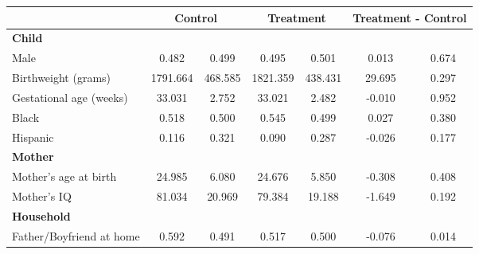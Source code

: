 \begin{tabular}{lcccccc}
\toprule
& \multicolumn{2}{c}{Control} & \multicolumn{2}{c}{Treatment} & \multicolumn{2}{c}{Treatment - Control} \\
\midrule
\textbf{Child} & & & & & & \\
\quad\quad Male & 0.482 & 0.499 & 0.495 & 0.501 & 0.013 & 0.674 \\
\quad\quad Birthweight (grams) & 1791.664 & 468.585 & 1821.359 & 438.431 & 29.695 & 0.297 \\
\quad\quad Gestational age (weeks) & 33.031 & 2.752 & 33.021 & 2.482 & -0.010 & 0.952 \\
\quad\quad Black & 0.518 & 0.500 & 0.545 & 0.499 & 0.027 & 0.380 \\
\quad\quad Hispanic & 0.116 & 0.321 & 0.090 & 0.287 & -0.026 & 0.177 \\
\textbf{Mother} & & & & & & \\
\quad\quad Mother's age at birth & 24.985 & 6.080 & 24.676 & 5.850 & -0.308 & 0.408 \\
\quad\quad Mother's IQ & 81.034 & 20.969 & 79.384 & 19.188 & -1.649 & 0.192 \\
\textbf{Household} & & & & & & \\
\quad\quad Father/Boyfriend at home & 0.592 & 0.491 & 0.517 & 0.500 & -0.076 & 0.014 \\
\bottomrule
\end{tabular}
